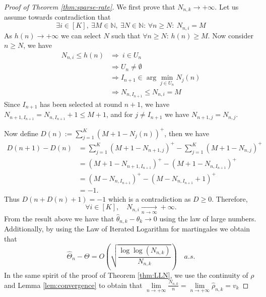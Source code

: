 \begin{proof}[Proof of Theorem \ref{thm:sparse-rate}]
	We first prove that \(N_{n,k} \to +\infty\). Let us assume towards contradiction that
	\[
	\exists i \in [K],\ \exists M \in \mathbb{N},\ \exists N \in \mathbb{N}: \, \forall n \geq N:\ N_{n,i} = M
	\]
	As \(h(n) \to +\infty\) we can select \(N\) such that \(\forall n \geq N: \, h(n) \geq M \). Now consider \( n \geq N \), we have
	\begin{align*}
		N_{n,i} \leq h(n) 
		& \Rightarrow \ i \in U_n \\
		& \Rightarrow U_n \neq \emptyset \\
		& \Rightarrow I_{n+1} \in \arg\min_{j \in U_n} N_j(n) \\
		& \Rightarrow N_{n, I_{n+1}} \leq N_{n,i} = M
	\end{align*}
	Since \( I_{n+1} \) has been selected at round \( n+1 \), we have \(N_{n+1, I_{n+1}} = N_{n, I_{n+1}} + 1 \leq M + 1\), and for \( j \neq I_{n+1} \) we have \(N_{n+1,j} = N_{n,j}\). 
	
	Now define \(D(n) := \sum_{j=1}^K \left(M + 1 - N_j(n)\right)^+\), then we have
	\begin{align*}
		D(n+1) - D(n)
		&= \sum_{j=1}^K \left(M + 1 - N_{n+1, j}\right)^+ 
		- \sum_{j=1}^K \left(M + 1 - N_{n,j}\right)^+ \\
		&= \left(M + 1 - N_{n+1, I_{n+1}}\right)^+ 
		- \left(M + 1 - N_{n, I_{n+1}}\right)^+ \\
		&= \left(M - N_{n, I_{n+1}}\right)^+ 
		- \left(M - N_{n, I_{n+1}} + 1\right)^+ \\
		&= -1.
	\end{align*}
	Thus \(D\left(n + D(n) + 1\right) = -1\) which is a contradiction as \(D \geq 0\). Therefore,
	\[
	\forall i \in [K], \quad N_{n,i} \xrightarrow[n\to\infty]{} +\infty.
	\]
	From the result above we have that \(\hat{\theta}_{n,k}-\theta_k \to 0\) using the law of large numbers. Additionally, by using the Law of Iterated Logarithm for martingales we obtain that
	\[\hat{\Theta}_n - \Theta = O\left(\sqrt{\frac{\log\log(N_{n,k})}{N_{n,k}}}\right) \quad a.s.\]
	In the same spirit of the proof of Theorem \ref{thm:LLN}, we use the continuity of \(\rho\) and Lemma \ref{lem:convergence} to obtain that \(\lim\limits_{n \to +\infty} \frac{N_{n,k}}{n} = \lim\limits_{n \to +\infty} \hat{\rho}_{n,k} = v_k\)
\end{proof}

